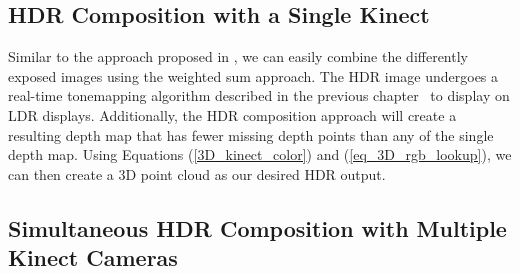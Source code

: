 \subsection{HDR Composition with a Single Kinect}
\label{sec_single_kinect}
Similar to the approach proposed in \cite{lo2012high}, we can easily combine the differently exposed images using the weighted sum approach. The HDR image undergoes a real-time tonemapping algorithm described in the previous chapter~\cite{lo2012high} to display on LDR displays. Additionally, the HDR composition approach will create a resulting depth map that has fewer missing depth points than any of the single depth map. Using Equations (\ref{3D_kinect_color}) and (\ref{eq_3D_rgb_lookup}), we can then create a 3D point cloud as our desired HDR output. 

\subsection{Simultaneous HDR Composition with Multiple Kinect Cameras}

